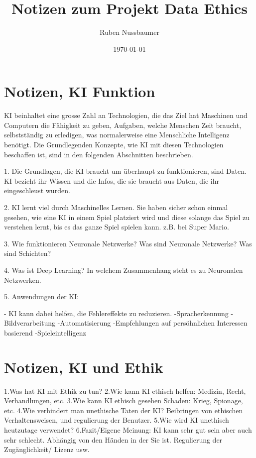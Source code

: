 \documentclass{article}
\title{Notizen zum Projekt Data Ethics}
\author{Ruben Nussbaumer}
\date{\today}
\begin{document}
\maketitle


\tableofcontents

\section{Notizen, KI Funktion}
KI beinhaltet eine grosse Zahl an Technologien, die das Ziel hat Maschinen und Computern die Fähigkeit
zu geben, Aufgaben, welche Menschen Zeit braucht, selbstständig zu erledigen, was normalerweise eine Menschliche Intelligenz benötigt.
Die Grundlegenden Konzepte, wie KI mit diesen Technologien beschaffen ist, sind in den folgenden Abschnitten beschrieben.

1. Die Grundlagen, die KI braucht um überhaupt zu funktionieren, sind Daten. KI bezieht ihr Wissen und die Infos, die sie braucht aus Daten, 
die ihr eingeschleust wurden.

2. KI lernt viel durch Maschinelles Lernen. Sie haben sicher schon einmal gesehen, wie eine KI in einem Spiel platziert wird und diese solange
das Spiel zu verstehen lernt, bis es das ganze Spiel spielen kann. z.B. bei Super Mario.

3. Wie funktionieren Neuronale Netzwerke? Was sind Neuronale Netzwerke? Was sind Schichten?

4. Was ist Deep Learning? In welchem Zusammenhang steht es zu Neuronalen Netzwerken.

5. Anwendungen der KI: 

    - KI kann dabei helfen, die Fehlereffekte zu reduzieren.
    -Spracherkennung
    -Bildverarbeitung
    -Automatisierung
    -Empfehlungen auf persöhnlichen Interessen basierend
    -Spieleintelligenz

 \section{Notizen, KI und Ethik}

 1.Was hat KI mit Ethik zu tun? 
 2.Wie kann KI ethisch helfen: Medizin, Recht, Verhandlungen, etc.
 3.Wie kann KI ethisch gesehen Schaden: Krieg, Spionage, etc.
 4.Wie verhindert man unethische Taten der KI? Beibringen von ethischen Verhaltensweisen, und regulierung der Benutzer.
 5.Wie wird KI unethisch heutzutage verwendet? 
 6.Fazit/Eigene Meinung: KI kann sehr gut sein aber auch sehr schlecht. Abhängig von den Händen in der Sie ist.
 Regulierung der Zugänglichkeit/ Lizenz usw.




\printbibliography
\end{document}
